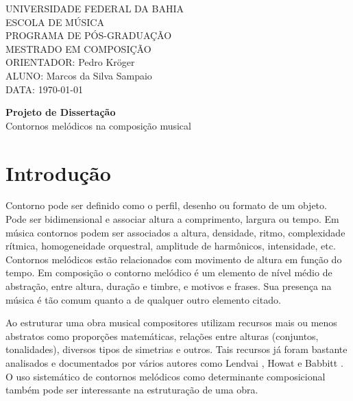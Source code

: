 \documentclass{article}
\begin{document}
\setlength{\parindent}{0cm}

\large
UNIVERSIDADE FEDERAL DA BAHIA \\
ESCOLA DE MÚSICA \\
PROGRAMA DE PÓS-GRADUAÇÃO \\
MESTRADO EM COMPOSIÇÃO \\
ORIENTADOR: Pedro Kröger \\
ALUNO: Marcos da Silva Sampaio \\
DATA: \today

\thispagestyle{empty}
\vspace{1cm}
\begin{center}{
    \Huge \textbf{Projeto de Dissertação} \\
}
\vspace{12pt}
{\Large Contornos melódicos na composição musical}

\end{center}
\vspace{1cm}

\section{Introdução}
\label{sec:introducao}

Contorno pode ser definido como o perfil, desenho ou formato de um
objeto. Pode ser bidimensional e associar altura a comprimento,
largura ou tempo. Em música contornos podem ser associados a altura,
densidade, ritmo, complexidade rítmica, homogeneidade orquestral,
amplitude de harmônicos, intensidade, etc. Contornos melódicos estão
relacionados com movimento de altura em função do tempo.
Em composição o contorno melódico é um elemento de nível médio de
abstração, entre altura, duração e timbre, e motivos e frases. Sua
presença na música é tão comum quanto a de qualquer outro elemento
citado. 


Ao estruturar uma obra musical compositores utilizam recursos mais ou
menos abstratos como proporções matemáticas, relações entre alturas
(conjuntos, tonalidades), diversos tipos de simetrias e outros. Tais
recursos já foram bastante analisados e documentados por vários
autores como Lendvai \cite{lendvai71:b}, Howat
\cite{howat83:debussy} e Babbitt \cite{babbitt61:set}. O uso
sistemático de contornos melódicos como determinante composicional
também pode ser interessante na estruturação de uma obra.
\end{document}
